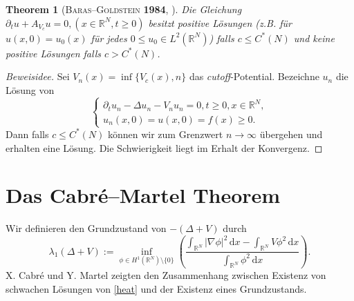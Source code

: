 \documentclass[11pt,twoside,a4paper]{article}
\newtheorem{thm}{Theorem}
\theoremstyle{break}
\begin{document}
\begin{thm}[\textsc{Baras--Goldstein} \textbf{1984}, \cite{baras-goldstein}]\label{main}
Die Gleichung  $\partial_t u + A_{V_c} u =0, (x\in \mathbb R^N, t\ge0)$ besitzt positive L\"osungen (z.B. f\"ur $u(x,0)=u_0(x)$ f\"ur jedes $0\le u_0\in L^2(\mathbb R^N)$) falls $c\le C^*(N)$ und keine positive L\"osungen falls $c>C^*(N)$.
\end{thm}
\begin{proof}[Beweisidee]
Sei $V_n(x)=\inf\{V_c(x), n\}$ das \emph{cutoff}-Potential. Bezeichne $u_n$ die L\"osung von
\begin{equation}\label{cutoff}
\begin{cases}
\partial_t u_n - \Delta u_n - V_n u_n =0, t\ge 0, x\in \mathbb R^N,\\
u_n(x,0)=u(x,0)=f(x)\ge 0.
\end{cases}
\end{equation}
Dann falls $c\le C^*(N)$ k\"onnen wir zum Grenzwert $n\to \infty$ \"ubergehen und erhalten eine L\"osung.  Die Schwierigkeit liegt im Erhalt der Konvergenz.
\end{proof}

\section{Das Cabr\'e--Martel Theorem}

Wir definieren den Grundzustand von $-(\Delta +V)$ durch
\begin{equation}\label{groundstate}
\lambda_1(\Delta + V):= \inf_{\phi \in H^1(\mathbb R^N)\setminus \{0\}} \left ( \frac{\int_{\mathbb R^N} |\nabla \phi|^2\, \mathrm dx - \int_{\mathbb R^N} V\phi^2\, \mathrm dx}{\int_{\mathbb R^N} \phi^2\, \mathrm dx} \right ).
\end{equation}
X. Cabr\'e und Y. Martel zeigten den Zusammenhang zwischen Existenz von schwachen L\"osungen von \eqref{heat} und der Existenz eines Grundzustands. 

\vspace{.25cm}
\end{document}
